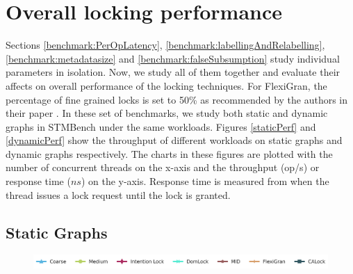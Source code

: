 \section{Overall locking performance}
Sections \ref{benchmark:PerOpLatency}, \ref{benchmark:labellingAndRelabelling}, \ref{benchmark:metadatasize} and \ref{benchmark:falseSubsumption} study individual parameters in isolation. Now, we study all of them together and evaluate their affects on overall performance of the locking techniques. For FlexiGran, the percentage of fine grained locks is set to 50\% as recommended by the authors in their paper \cite{FlexiGran2024}. In these set of benchmarks, we study both static and dynamic graphs in STMBench under the same workloads. 
Figures \ref{staticPerf} and \ref{dynamicPerf} show the throughput of different workloads on static graphs and dynamic graphs respectively. 
The charts in these figures are plotted with the number of concurrent threads on the x-axis and the throughput (op/s) or response time ($ns$) on the y-axis. 
Response time is measured from when the thread issues a lock request until the lock is granted.


\subsection{Static Graphs} \label{benchmark:StaticOverallPerf}

\begin{figure}
	\centering
	\includegraphics[width=.9\textwidth]{figures/PerformanceCharts/Legend}
\end{figure}

